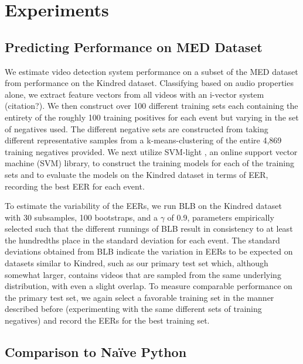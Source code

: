 
\section{Experiments}

\subsection{Predicting Performance on MED Dataset}

We estimate video detection system performance on a subset of the MED dataset from performance on the Kindred dataset.
Classifying based on audio properties alone, we extract feature vectors from all videos with an i-vector system (citation?).
We then construct over 100 different training sets each containing the entirety of the roughly 100 training positives for each event but varying in the set of negatives used. The different negative sets are constructed from taking different representative samples from a k-means-clustering of the entire 4,869 training negatives provided.
We next utilize SVM-light \cite{svm}, an online support vector machine (SVM) library, to construct the training models for each of the training sets and to evaluate the models on the Kindred dataset in terms of EER, recording the best EER for each event.

To estimate the variability of the EERs, we run BLB on the Kindred dataset with 30 subsamples, 100 bootstraps, and a $\gamma$ of 0.9, parameters empirically selected such that the different runnings of BLB result in consistency to at least the hundredths place in the standard deviation for each event. 
The standard deviations obtained from BLB indicate the variation in EERs to be expected on datasets similar to Kindred, such as our primary test set which, although somewhat larger, contains videos that are sampled from the same underlying distribution, with even a slight overlap. 
To measure comparable performance on the primary test set, we again select a favorable training set in the manner described before (experimenting with the same different sets of training negatives) and record the EERs for the best training set. 

\subsection{Comparison to Na\"ive Python}

